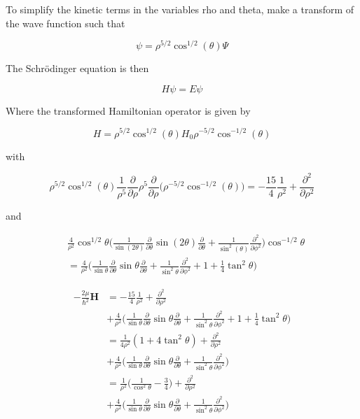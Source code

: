 \documentclass{article}
\begin{document}
To simplify the kinetic terms in the variables rho and theta, make a transform of the wave function such that

\begin{equation}
\psi = \rho^{5/2} \cos^{1/2}(\theta) \Psi
\end{equation}

The Schr{\"o}dinger equation is then

\begin{equation}
H \psi = E \psi 
\end{equation}

Where the transformed Hamiltonian operator is given by

\begin{equation}
H = \rho^{5/2} \cos^{1/2}{(\theta)} H_{0} \rho^{-5/2} \cos^{-1/2}{(\theta)}
\end{equation}

with

\begin{equation}
\rho^{5/2} \cos^{1/2}{(\theta)} \frac{1}{\rho^{5}} \frac{\partial}{\partial \rho} \rho^{5} \frac{\partial}{\partial \rho} \Big( \rho^{-5/2} \cos^{-1/2}{(\theta)} \Big) = -\frac{15}{4} \frac{1}{\rho^{2}} + \frac{\partial^{2}}{\partial \rho^{2}}
\end{equation}

and

\begin{align}
&\frac{4}{\rho^{2}}\cos^{1/2}\theta \Big( \frac{1}{\sin(2\theta)} \frac{\partial}{\partial \theta} \sin(2\theta) \frac{\partial}{\partial \theta} + \frac{1}{\sin^{2}(\theta)} \frac{\partial^{2}}{\partial \phi^{2}} \Big) \cos^{-1/2}\theta\\
&=\frac{4}{\rho^{2}}\Big( \frac{1}{\sin\theta} \frac{\partial}{\partial \theta} \sin\theta \frac{\partial}{\partial \theta} + \frac{1}{\sin^{2}\theta} \frac{\partial^{2}}{\partial \phi^{2}} + 1 + \frac{1}{4}\tan^2\theta \Big)
\end{align}

\begin{align}
-\frac{2\mu}{\hbar^2}\mathbf{H} &= -\frac{15}{4} \frac{1}{\rho^{2}} + \frac{\partial^{2}}{\partial \rho^{2}}\\
& + \frac{4}{\rho^{2}}\Big( \frac{1}{\sin\theta} \frac{\partial}{\partial \theta} \sin\theta \frac{\partial}{\partial \theta} + \frac{1}{\sin^{2}\theta} \frac{\partial^{2}}{\partial \phi^{2}} + 1 + \frac{1}{4}\tan^2\theta \Big)\\
&= \frac{1}{4\rho^{2}}(1 + 4\tan^2\theta) + \frac{\partial^{2}}{\partial \rho^{2}}\\
& + \frac{4}{\rho^{2}}\Big( \frac{1}{\sin\theta} \frac{\partial}{\partial \theta} \sin\theta \frac{\partial}{\partial \theta} + \frac{1}{\sin^{2}\theta} \frac{\partial^{2}}{\partial \phi^{2}} \Big)\\
&= \frac{1}{\rho^{2}}\Big(\frac{1}{\cos^2\theta} - \frac{3}{4}\Big) + \frac{\partial^{2}}{\partial \rho^{2}}\\
& + \frac{4}{\rho^{2}}\Big( \frac{1}{\sin\theta} \frac{\partial}{\partial \theta} \sin\theta \frac{\partial}{\partial \theta} + \frac{1}{\sin^{2}\theta} \frac{\partial^{2}}{\partial \phi^{2}} \Big)\\
\end{align}
\end{document}
